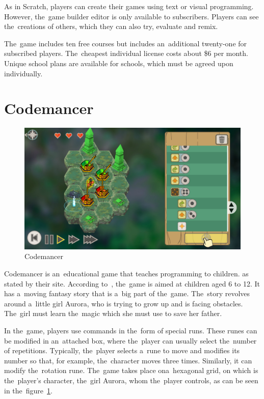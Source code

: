 As in Scratch, players can create their games using text or visual programming.
However, the~game builder editor is only available to subscribers.
Players can see the~creations of others, which they can also try, evaluate and remix.

The~game includes ten free courses but includes an~additional twenty-one for subscribed players.
The~cheapest individual license costs about \$6 per month.
Unique school plans are available for schools, which must be agreed upon individually.

\section{Codemancer}

\begin{figure}
    \centering
    \includegraphics[width=1\linewidth]{assets/similar-games/codemancer.jpg}
    \caption{Codemancer~\cite{a2021_codemancer}}
    \label{fig:codemancer}
\end{figure}

Codemancer is an~educational game that teaches programming to children.
 as stated by their site.
According to~\cite{a2021_codemancer}, the~game is aimed at children aged 6 to 12.
It has a~moving fantasy story that is a~big part of the~game.
The~story revolves around a~little girl Aurora, who is trying to grow up and is facing obstacles.
The~girl must learn the~magic which she must use to save her father.

In the~game, players use commands in the~form of special runs.
These runes can be modified in an~attached box, where the~player can usually \mbox{select} the~number of repetitions.
Typically, the~player selects a~rune to move and modifies its number so that, for example, the~character moves three times.
Similarly, it can modify the~rotation rune.
The~game takes place on\linebreak{}a~hexagonal grid, on which is the~player's character, the~girl Aurora, whom the~player controls, as can be seen in the~figure~\ref{fig:codemancer}.

